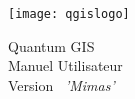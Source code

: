 \begin{titlepage}
\begin{center}

\begin{center}
\texttt{[image: qgislogo]} 
\end{center}

\Huge{Quantum GIS}\\
\vspace{0.5cm}
\Large{Manuel Utilisateur} \\
\vspace{0.5cm}
\Large{Version ~\CURRENT \textsl{'Mimas'}}

\end{center}
\end{titlepage}

